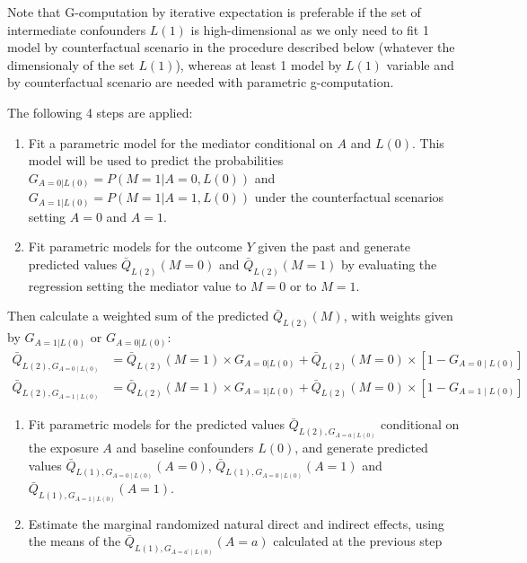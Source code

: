 \documentclass[
]{book}
\begin{document}
Note that G-computation by iterative expectation is preferable if the set of intermediate confounders \(L(1)\) is high-dimensional as we only need to fit 1 model by counterfactual scenario in the procedure described below (whatever the dimensionaly of the set \(L(1)\)), whereas at least 1 model by \(L(1)\) variable and by counterfactual scenario are needed with parametric g-computation.

The following 4 steps are applied:

\begin{enumerate}
\def\labelenumi{\arabic{enumi}.}
\item
  Fit a parametric model for the mediator conditional on \(A\) and \(L(0)\). This model will be used to predict the probabilities \(G_{A=0|L(0)}=P(M=1|A=0,L(0))\) and \(G_{A=1|L(0)}=P(M=1|A=1,L(0))\) under the counterfactual scenarios setting \(A=0\) and \(A=1\).
\item
  Fit parametric models for the outcome \(Y\) given the past and generate predicted values \(\bar{Q}_{L(2)}(M=0)\) and \(\bar{Q}_{L(2)}(M=1)\) by evaluating the regression setting the mediator value to \(M=0\) or to \(M=1\).
\end{enumerate}

Then calculate a weighted sum of the predicted \(\bar{Q}_{L(2)}(M)\), with weights given by \(G_{A=1|L(0)}\) or \(G_{A=0|L(0)}\):
\begin{align*}
  \bar{Q}_{L(2),G_{A=0 \mid L(0)}} &= \bar{Q}_{L(2)}(M=1) \times G_{A=0|L(0)} + \bar{Q}_{L(2)}(M=0) \times \left[1 - G_{A=0 \mid L(0)} \right] \\
  \bar{Q}_{L(2),G_{A=1 \mid L(0)}} &= \bar{Q}_{L(2)}(M=1) \times G_{A=1|L(0)} + \bar{Q}_{L(2)}(M=0) \times \left[1 - G_{A=1 \mid L(0)} \right]
\end{align*}

\begin{enumerate}
\def\labelenumi{\arabic{enumi}.}
\setcounter{enumi}{2}
\item
  Fit parametric models for the predicted values \(\bar{Q}_{L(2),G_{A=a \mid L(0)}}\) conditional on the exposure \(A\) and baseline confounders \(L(0)\), and generate predicted values \(\bar{Q}_{L(1),G_{A=0 \mid L(0)}}(A=0)\), \(\bar{Q}_{L(1),G_{A=0 \mid L(0)}}(A=1)\) and \(\bar{Q}_{L(1),G_{A=1 \mid L(0)}}(A=1)\).
\item
  Estimate the marginal randomized natural direct and indirect effects, using the means of the \(\bar{Q}_{L(1),G_{A=a^\prime \mid L(0)}}(A=a)\) calculated at the previous step
\end{enumerate}
\end{document}
